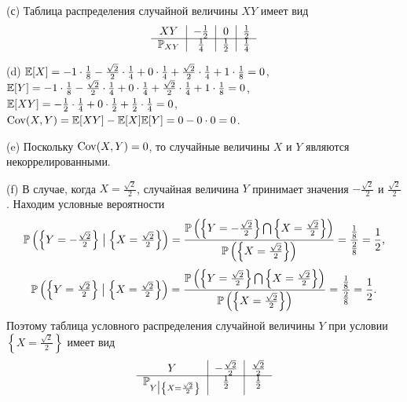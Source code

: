 \documentclass[12pt, a4paper]{article}\usepackage[]{graphicx}\usepackage[]{color}
\begin{document}
\begin{enumerate}
					(с) Таблица распределения случайной величины $XY$ имеет вид
					\[
					\begin{tabular}{c|c|c|c}
					$XY$               & $-\frac{1}{2}$     & $0$             & $\frac{1}{2}$  \\ \cline{1-4}
					$\P_{XY}$  & $\frac{1}{4}$      & $\frac{1}{2}$   & $\frac{1}{4}$  \\
					\end{tabular}
					\]

					(d) $\E[X] = -1 \cdot \frac{1}{8} - \frac{\sqrt{2}}{2} \cdot \frac{1}{4} + 0 \cdot \frac{1}{4} + \frac{\sqrt{2}}{2} \cdot \frac{1}{4} + 1 \cdot \frac{1}{8} = 0$,
					$\E[Y] = -1 \cdot \frac{1}{8} - \frac{\sqrt{2}}{2} \cdot \frac{1}{4} + 0 \cdot \frac{1}{4} + \frac{\sqrt{2}}{2} \cdot \frac{1}{4} + 1 \cdot \frac{1}{8} = 0$,
					$\E[XY] = -\frac{1}{2} \cdot \frac{1}{4} + 0 \cdot \frac{1}{2} + \frac{1}{2} \cdot \frac{1}{4} = 0$,
					$\Cov(X,Y) = \E[XY] - \E[X]\E[Y] = 0 - 0 \cdot 0 = 0$.

					(e) Поскольку $\Cov(X,Y) = 0$, то случайные величины $X$ и $Y$ являются некоррелированными.

					(f) В случае, когда $X = \frac{\sqrt{2}}{2}$, случайная величина $Y$ принимает значения $-\frac{\sqrt{2}}{2}$ и $\frac{\sqrt{2}}{2}$. Находим условные вероятности
					\[
					\P\left(\left\{Y=-\tfrac{\sqrt{2}}{2}\right\} \bigm| \left\{X = \tfrac{\sqrt{2}}{2}\right\}\right) =
					\frac{\P\left(\left\{Y=-\tfrac{\sqrt{2}}{2}\right\} \bigcap \left\{X = \tfrac{\sqrt{2}}{2}\right\}\right)}{\P\left(\left\{X = \tfrac{\sqrt{2}}{2}\right\}\right)} = \frac{\tfrac{1}{8}}{\tfrac{2}{8}} = \frac{1}{2} \text{,}
					\]
					\[
					\P\left(\left\{Y=\tfrac{\sqrt{2}}{2}\right\} \bigm| \left\{X = \tfrac{\sqrt{2}}{2}\right\}\right) =
					\frac{\P\left(\left\{Y=\tfrac{\sqrt{2}}{2}\right\} \bigcap \left\{X = \tfrac{\sqrt{2}}{2}\right\}\right)}{\P\left(\left\{X = \tfrac{\sqrt{2}}{2}\right\}\right)} = \frac{\tfrac{1}{8}}{\tfrac{2}{8}} = \frac{1}{2} \text{.}
					\]
					Поэтому таблица условного распределения случайной величины $Y$ при условии $\left\{X = \frac{\sqrt{2}}{2}\right\}$ имеет вид
					\[
					\begin{tabular}{c|c|c}
					$Y$                                                             & $-\frac{\sqrt{2}}{2}$     & $\frac{\sqrt{2}}{2}$    \\ \cline{1-3}
					$\P_{Y\bigm|\left\{X = \frac{\sqrt{2}}{2}\right\}}$     & $\frac{1}{2}$             & $\frac{1}{2}$           \\
					\end{tabular}
					\]


\end{enumerate}
\end{document}
